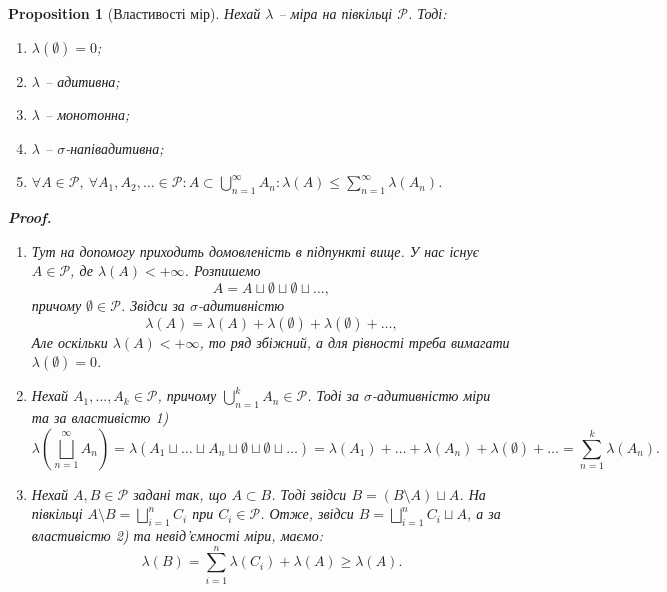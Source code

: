 \documentclass[a4paper, 10pt]{article}
\makeatletter
\theoremstyle{theoremdd}
\newtheorem{proposition}[theorem]{Proposition}
\renewenvironment{proof}[1][Proof.\\]{\par
\pushQED{\hfill \qed}%
\normalfont \topsep6\p@\@plus6\p@\relax
\trivlist
\item\relax
{\bfseries
#1\@addpunct{.}}\hspace\labelsep\ignorespaces
}{%
\popQED\endtrivlist\@endpefalse
}
\newcommand\nospacebeforeitem{
\vspace{-\topsep}
\vspace{-\topsep}
\vspace{-\topsep}
}
\makeatother
\begin{document}
\begin{proposition}[Властивості мір]
Нехай $\lambda$ -- міра на півкільці $\mathcal{P}$. Тоді:
\begin{enumerate}[nosep,wide=0pt,label={\arabic*)}]
\item $\lambda(\emptyset) = 0$;
\item $\lambda$ -- адитивна;
\item $\lambda$ -- монотонна;
\item $\lambda$ -- $\sigma$-напівадитивна;
\item $\forall A \in \mathcal{P},\ \forall A_1,A_2,\dots \in \mathcal{P}: A \subset \displaystyle\bigcup_{n=1}^\infty A_n: \lambda(A) \leq \displaystyle\sum_{n=1}^\infty \lambda(A_n)$.
\end{enumerate}

\begin{proof}
\nospacebeforeitem
\begin{enumerate}[wide=0pt, label={\arabic*)}]
\item Тут на допомогу приходить домовленість в підпункті вище. У нас існує $A \in \mathcal{P}$, де $\lambda(A) < +\infty$. Розпишемо 
\[
A =  A \sqcup \emptyset \sqcup \emptyset \sqcup \dots,
\]
причому $\emptyset \in \mathcal{P}$. Звідси за $\sigma$-адитивністю \[
\lambda(A) = \lambda(A) + \lambda(\emptyset) + \lambda(\emptyset) + \dots,
\] Але оскільки $\lambda(A) < +\infty$, то ряд збіжний, а для рівності треба вимагати $\lambda(\emptyset) = 0$.

\item Нехай $A_1,\dots,A_k \in \mathcal{P}$, причому $\displaystyle\bigcup_{n=1}^k A_n \in \mathcal{P}$. Тоді за $\sigma$-адитивністю міри та за властивістю 1) 
\[
\displaystyle\lambda\left( \bigsqcup_{n=1}^\infty A_n \right) = \lambda(A_1 \sqcup \dots \sqcup A_n \sqcup \emptyset \sqcup \emptyset \sqcup \dots) = \lambda(A_1) + \dots + \lambda(A_n) + \lambda(\emptyset) + \dots = \sum_{n=1}^k \lambda(A_n).
\]

\item Нехай $A,B \in \mathcal{P}$ задані так, що $A \subset B$. Тоді звідси $B = (B \setminus A) \sqcup A$. На півкільці $A \setminus B = \displaystyle\bigsqcup_{i=1}^n C_i$ при $C_i \in \mathcal{P}$. Отже, звідси $B = \displaystyle\bigsqcup_{i=1}^n C_i \sqcup A$, а за властивістю 2) та невід'ємності міри, маємо: 
\[
\lambda(B) = \displaystyle\sum_{i=1}^n \lambda(C_i) + \lambda(A) \geq \lambda(A).
\]


\end{enumerate}
\end{proof}
\end{proposition}
\end{document}
